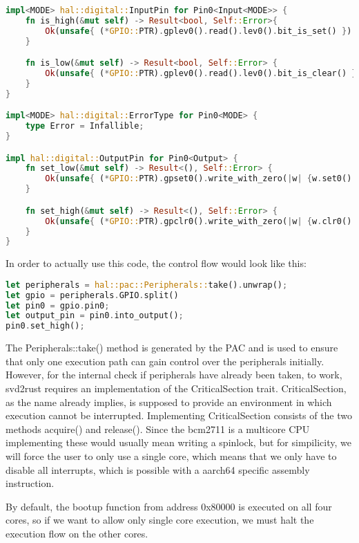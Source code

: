 \begin{lstlisting}[language=Rust,style=colouredRust]
impl<MODE> hal::digital::InputPin for Pin0<Input<MODE>> {
    fn is_high(&mut self) -> Result<bool, Self::Error>{
        Ok(unsafe{ (*GPIO::PTR).gplev0().read().lev0().bit_is_set() })
    }

    fn is_low(&mut self) -> Result<bool, Self::Error> {
        Ok(unsafe{ (*GPIO::PTR).gplev0().read().lev0().bit_is_clear() })
    }
}

impl<MODE> hal::digital::ErrorType for Pin0<MODE> {
    type Error = Infallible;
}

impl hal::digital::OutputPin for Pin0<Output> {
    fn set_low(&mut self) -> Result<(), Self::Error> {
        Ok(unsafe{ (*GPIO::PTR).gpset0().write_with_zero(|w| {w.set0().set_bit()}) })
    }

    fn set_high(&mut self) -> Result<(), Self::Error> {
        Ok(unsafe{ (*GPIO::PTR).gpclr0().write_with_zero(|w| {w.clr0().clear_bit_by_one()}) })
    }
}
\end{lstlisting}

In order to actually use this code, the control flow would look like this:

\begin{lstlisting}[language=Rust,style=colouredRust]
let peripherals = hal::pac::Peripherals::take().unwrap();
let gpio = peripherals.GPIO.split()
let pin0 = gpio.pin0;
let output_pin = pin0.into_output();
pin0.set_high();
\end{lstlisting}

The Peripherals::take() method is generated by the PAC and is used to ensure that only one execution path can gain control over the peripherals initially.
However, for the internal check if peripherals have already been taken, to work, svd2rust requires an implementation of the CriticalSection trait.
CriticalSection, as the name already implies, is supposed to provide an environment in which execution cannot be interrupted.
Implementing CriticalSection consists of the two methods acquire() and release().
Since the bcm2711 is a multicore CPU implementing these would usually mean writing a spinlock,
but for simpilicity, we will force the user to only use a single core, which means that we only have to disable all interrupts,
which is possible with a aarch64 specific assembly instruction.



By default, the bootup function from address 0x80000 is executed on all four cores,
so if we want to allow only single core execution, we must halt the execution flow on the other cores.

